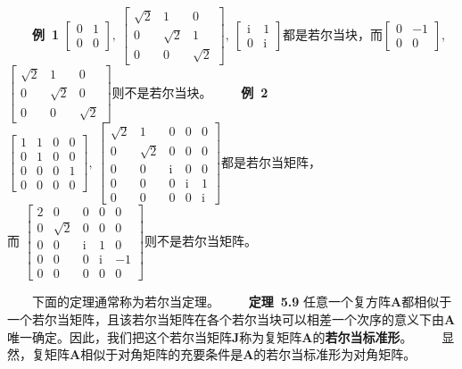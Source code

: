 \documentclass[compress,mathserif,cjk]{beamer}
\theoremstyle{remark}
\numberwithin{equation}{section}
\newcommand{\hei}{\bf}      %
\begin{document}
\begin{CJK}{UTF8}{gbsn}
\begin{frame}
\ \ \ \ {\hei 例~1} $\left[\begin{matrix}0&1\\0&0\end{matrix}\right],~\left[\begin{matrix}\sqrt2&1&0\\0&\sqrt2&1\\0&0&\sqrt2\end{matrix}\right],
~\left[\begin{matrix}\mathrm i&1\\0&\mathrm i\end{matrix}\right]$都是若尔当块，而$\left[\begin{matrix}0&-1\\0&0\end{matrix}\right]$,\\$\left[\begin{matrix}\sqrt2&1&0\\0&\sqrt2&0\\0&0&\sqrt2\end{matrix}\right]$则不是若尔当块。
\pause\vskip 5pt
\ \ \ \ {\hei 例~2} $\left[\begin{matrix}1&1&0&0\\0&1&0&0\\0&0&0&1\\0&0&0&0\end{matrix}\right],~\left[\begin{matrix}\sqrt2&1&0&0&0\\0&\sqrt2&0&0&0\\0&0&\mathrm i&0&0\\0&0&0&\mathrm i&1\\
0&0&0&0&\mathrm i\end{matrix}\right]$都是若尔当矩阵，\\
而
$\left[\begin{matrix}2&0&0&0&0\\0&\sqrt2&0&0&0\\0&0&\mathrm i&1&0\\0&0&0&\mathrm i&-1\\0&0&0&0&0\end{matrix}\right]$则不是若尔当矩阵。
\end{frame}

\begin{frame}
\ \ \ \ 下面的定理通常称为若尔当定理。
\vskip 5pt
\ \ \ \ {\hei 定理~5.9} 任意一个复方阵$\bm A$都相似于一个若尔当矩阵，且该若尔当矩阵在各个若尔当块可以相差一个次序的意义下由$\bm A$唯一确定。因此，我们把这个若尔当矩阵$\bm J$称为复矩阵$\bm A$的{\hei 若尔当标准形}。
\pause\vskip 5pt
\ \ \ \ 显然，复矩阵$\bm A$相似于对角矩阵的充要条件是$\bm A$的若尔当标准形为对角矩阵。
\end{frame}


\end{CJK}
\end{document}
